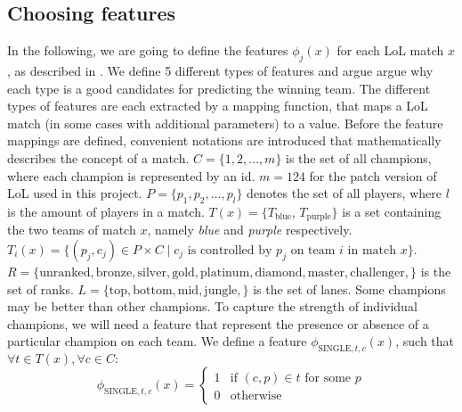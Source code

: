 \subsection{Choosing features}\label{sec:choosingfeatures}
In the following, we are going to define the features $\phi_j(x)$ for each LoL match $x$, as described in .
We define 5 different types of features and argue argue why each type is a good candidates for predicting the winning team.
The different types of features are each extracted by a mapping function, that maps a LoL match (in some cases with additional parameters) to a value. 
Before the feature mappings are defined, convenient notations are introduced that mathematically describes the concept of a match.
$C = \{1, 2, \dots, m\}$ is the set of all champions, where each champion is represented by an id. $m = 124$ for the patch version of LoL used in this project.
$P = \{p_1, p_2, \dots, p_l\}$ denotes the set of all players, where $l$ is the amount of players in a match.
$T(x) = \{T_\text{blue}$, $T_\text{purple}\}$ is a set containing the two teams of match $x$, namely \emph{blue} and \emph{purple} respectively.
$T_i(x) = \{ (p_j, c_j) \in P \times C \mid c_j \text{ is controlled by } p_j \text{ on team } i  \text{ in match } x \}$.
$R = \{\text{unranked},\text{bronze},\text{silver},\text{gold},\text{platinum},\text{diamond},\text{master},\text{challenger},\}$ is the set of ranks.
$L = \{\text{top},\text{bottom},\text{mid},\text{jungle},\}$ is the set of lanes.
Some champions may be better than other champions. To capture the strength of individual champions, we will need a feature that represent the presence or absence of a particular champion on each team.
We define a feature $\phi_{\text{SINGLE}, t, c}(x)$, such that $\forall t \in T(x), \forall c \in C:$
\begin{equation}\label{eq:single}  
\phi_{\text{SINGLE}, t, c}(x) = 
\begin{cases} 
  1 & \text{if } (c, p) \in t \text{ for some } p \\
  0 & \text{otherwise} 
\end{cases}
\end{equation}



